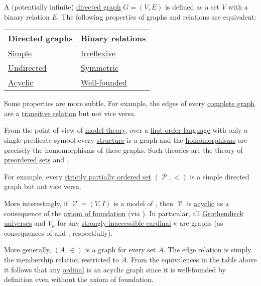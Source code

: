 \begin{remark}\label{rem:directed_graphs_model_theory}
  A (potentially infinite) \hyperref[def:graph/directed]{directed graph} \( G = (V, E) \) is defined as a set \( V \) with a binary relation \( E \). The following properties of graphs and relations are equivalent:
  \begin{center}
    \begin{tabular}{l | l}
      \hyperref[def:graph/directed]{Directed graphs}           & \hyperref[def:binary_relation]{Binary relations} \\
      \hline
      \hyperref[def:graph/directed/simple]{Simple}             & \hyperref[def:binary_relation/irreflexive]{Irreflexive} \\
      \hyperref[def:graph/undirected]{Undirected}              & \hyperref[def:binary_relation/symmetric]{Symmetric} \\
      \hyperref[def:graph_paths/undirected_path]{Acyclic}      & \hyperref[def:well_founded_relation]{Well-founded} \\
    \end{tabular}
  \end{center}

  Some properties are more subtle. For example, the edges of every \hyperref[def:graph_adjacency/complete_graph]{complete graph} are a \hyperref[def:binary_relation/transitive]{transitive relation} but not vice versa.

  From the point of view of \hyperref[subsec:first_order_models]{model theory}, over a \hyperref[def:first_order_language]{first-order language} with only a single predicate symbol every \hyperref[def:first_order_structure]{structure} is a graph and the \hyperref[def:first_order_homomorphism]{homomorphisms} are precisely the homomorphisms of these graphs. Such theories are the theory of \hyperref[def:preordered_set]{preordered sets} and \hyperref[def:zfc]{}.

  For example, every \hyperref[def:partially_ordered_set/strict]{strictly partially ordered set} \( (\mscrP, <) \) is a simple directed graph but not vice versa.

  More interestingly, if \( \mscrV = (V, I) \) is a model of \hyperref[def:zfc]{}, then \( \mscrV \) is \hyperref[def:graph_paths/undirected_path]{acyclic} as a consequence of the \hyperref[def:zfc/foundation]{axiom of foundation} (via ). In particular, all \hyperref[def:grothendieck_universe]{Grothendieck universes} and \( V_\kappa \) for any \hyperref[def:regular_cardinal]{strongly inaccessible cardinal} \( \kappa \) are graphs (as consequences of  and , respectfully).

  More generally, \( (A, \in) \) is a graph for every set \( A \). The edge relation is simply the membership relation restricted to \( A \). From the equivalences in the table above it follows that any \hyperref[def:ordinal]{ordinal} is an acyclic graph since it is well-founded by definition even without the axiom of foundation.
\end{remark}
